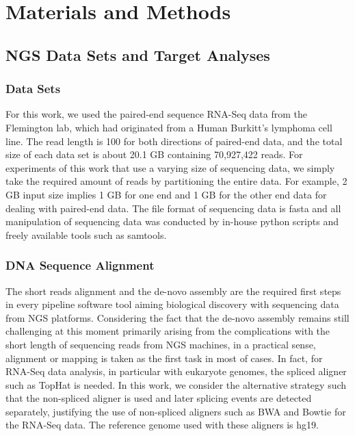 \documentclass{sig-alternate}
\begin{document}
{\section{Materials and Methods}\label{sec:materials_and_methods}
\subsection{NGS Data Sets and Target Analyses}
\subsubsection{Data Sets}

For this work, we used the paired-end sequence RNA-Seq data from the Flemington lab, which had originated from a Human Burkitt's lymphoma cell line\cite{erik_2010}.  The read length is 100 for both directions of paired-end data, and the total size of each data set is about 20.1 GB containing 70,927,422 reads.  For experiments of this work that use a varying size of sequencing data, we simply take the required amount of reads by partitioning the entire data.  For example, 2 GB input size implies 1 GB for one end and 1 GB for the other end data for dealing with paired-end data.  The file format of sequencing data is fasta and all manipulation of sequencing data was conducted by in-house python scripts and freely available tools such as samtools\cite{samtools}.  

\subsubsection{DNA Sequence Alignment}

The short reads alignment and the de-novo assembly are the required first steps in every pipeline software tool aiming biological discovery with sequencing data from NGS platforms.  Considering the fact that the de-novo assembly remains still challenging at this moment primarily arising from the complications with the short length of sequencing reads from NGS machines, in a practical sense, alignment or mapping is taken as the first task in most of cases.  In fact, for RNA-Seq data analysis, in particular with eukaryote genomes, the spliced aligner such as TopHat\cite{pepke2009} is needed. In this work, we consider the alternative strategy such that the non-spliced aligner is used and later splicing events are detected separately, justifying the use of non-spliced aligners such as BWA and Bowtie for the RNA-Seq data.  The reference genome used with these aligners is hg19.

}
\end{document}
